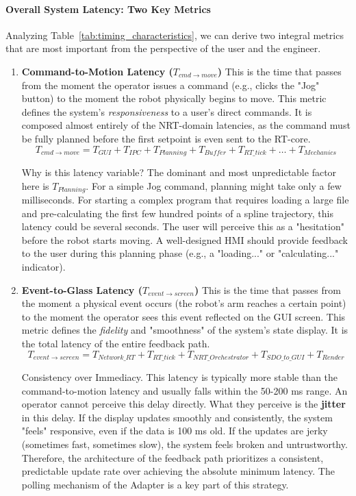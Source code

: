 \paragraph{Overall System Latency: Two Key Metrics}
Analyzing Table~\ref{tab:timing_characteristics}, we can derive two integral metrics that are most important from the perspective of the user and the engineer.

\begin{enumerate}
    \item \textbf{Command-to-Motion Latency (\(T_{cmd \to move}\))}
    This is the time that passes from the moment the operator issues a command (e.g., clicks the "Jog" button) to the moment the robot physically begins to move. This metric defines the system's \textit{responsiveness} to a user's direct commands. It is composed almost entirely of the NRT-domain latencies, as the command must be fully planned before the first setpoint is even sent to the RT-core.
    \[
    T_{cmd \to move} = T_{GUI} + T_{IPC} + T_{Planning} + T_{Buffer} + T_{RT\_tick} + \dots + T_{Mechanics}
    \]
    
\begin{principlebox}{Why is this latency variable?}
    The dominant and most unpredictable factor here is \(T_{Planning}\). For a simple Jog command, planning might take only a few milliseconds. For starting a complex program that requires loading a large file and pre-calculating the first few hundred points of a spline trajectory, this latency could be several seconds. The user will perceive this as a "hesitation" before the robot starts moving. A well-designed HMI should provide feedback to the user during this planning phase (e.g., a "loading..." or "calculating..." indicator).
\end{principlebox}

    \item \textbf{Event-to-Glass Latency (\(T_{event \to screen}\))}
    This is the time that passes from the moment a physical event occurs (the robot's arm reaches a certain point) to the moment the operator sees this event reflected on the GUI screen. This metric defines the \textit{fidelity} and "smoothness" of the system's state display. It is the total latency of the entire feedback path.
    \[
    T_{event \to screen} = T_{Network\_RT} + T_{RT\_tick} + T_{NRT\_Orchestrator} + T_{SDO\_to\_GUI} + T_{Render}
    \]
    
\begin{principlebox}{Consistency over Immediacy.}
    This latency is typically more stable than the command-to-motion latency and usually falls within the 50-200 ms range. An operator cannot perceive this delay directly. What they perceive is the \textbf{jitter} in this delay. If the display updates smoothly and consistently, the system "feels" responsive, even if the data is 100 ms old. If the updates are jerky (sometimes fast, sometimes slow), the system feels broken and untrustworthy. Therefore, the architecture of the feedback path prioritizes a consistent, predictable update rate over achieving the absolute minimum latency. The polling mechanism of the Adapter is a key part of this strategy.
\end{principlebox}
\end{enumerate}

